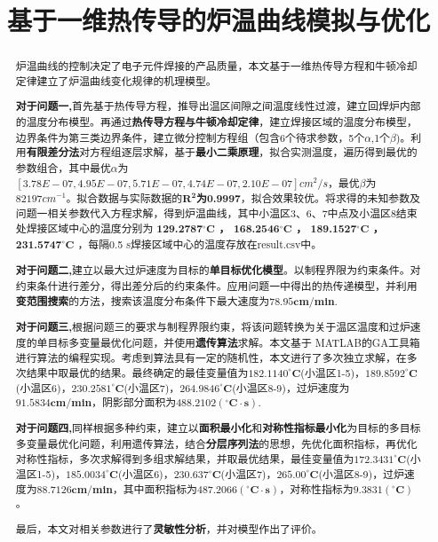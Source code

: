 \documentclass[withoutpreface,bwprint]{cumcmthesis} %
\title{基于一维热传导的炉温曲线模拟与优化}
\begin{document}
	\maketitle
	\begin{abstract}
		炉温曲线的控制决定了电子元件焊接的产品质量，本文基于一维热传导方程和牛顿冷却定律建立了炉温曲线变化规律的机理模型。
		
		\textbf{对于问题一,}首先基于热传导方程，推导出温区间隙之间温度线性过渡，建立回焊炉内部的温度分布模型。再通过\textbf{热传导方程与牛顿冷却定律}，建立焊接区域的温度分布模型，边界条件为第三类边界条件，建立微分控制方程组（包含6个待求参数，5个$\alpha$,1个$\beta$)。利用\textbf{有限差分法}对方程组逐层求解，基于\textbf{最小二乘原理}，拟合实测温度，遍历得到最优的参数组合，其中最优$\alpha$为$[3.78E-07, 4.95E-07 , 5.71E-07, 4.74E-07,  2.10E-07 ]cm^2/s$，最优$\beta$为$82197 cm^{-1}$。拟合数据与实际数据的\textbf{$\bm{R^2}$为0.9997}，拟合效果较优。将求得的未知参数及问题一相关参数代入方程求解，得到炉温曲线，其中小温区3、6、7中点及小温区8结束处焊接区域中心的温度分别为\textbf{	129.2787$\bm{^\circ C }$ ， 168.2546$\bm{^\circ C}$  ， 189.1527$\bm{^\circ C}$   ， 231.5747$\bm{^\circ C}$ }，每隔0.5 s焊接区域中心的温度存放在result.csv中。
		
		\textbf{对于问题二,}建立以最大过炉速度为目标的\textbf{单目标优化模型}。以制程界限为约束条件。对约束条什进行差分，得出差分后的约束条件。应用问题一中得出的热传递模型，并利用\textbf{变范围搜索}的方法，搜索该温度分布条件下最大速度为$\bm{78.95cm/min}$.
		
		\textbf{对于问题三,}根据问题三的要求与制程界限约東，将该问题转换为关于温区温度和过炉速度的单目标多变量最优化问题，并使用\textbf{遗传算法}求解。本文基于 MATLAB的GA工具箱进行算法的编程实现。考虑到算法具有一定的随机性，本文进行了多次独立求解，在多次结果中取最优的结果。最终确定的最佳变量值为$\bm{182.1140^\circ C} $(小温区1-5)，$\bm{189.8592^\circ C }$(小温区6)，$\bm{230.2581^\circ C }$(小温区7)，$\bm{264.9846^\circ C} $(小温区8-9)，过炉速度为$\bm{91.5834cm/min}$，阴影部分面积为$\bm{488.2102(^\circ C \cdot s)}$.
		
		\textbf{对于问题四,}同样根据多种约束，建立以\textbf{面积最小化}和\textbf{对称性指标最小化}为目标的多目标多变量最优化问题，利用遗传算法，结合\textbf{分层序列法}的思想，先优化面积指标，再优化对称性指标，多次求解得到多组求解结果，并取最优结果，最佳变量值为$\bm{172.3431^\circ C }$(小温区1-5)，$\bm{185.0034^\circ C} $(小温区6)，$\bm{230.637^\circ C }$(小温区7)，$\bm{265.00^\circ C }$(小温区8-9)，过炉速度为$\bm{88.7126cm/min}$，其中面积指标为$\bm{487.2066(^\circ C \cdot s)}$，对称性指标为$\bm{9.3831(^\circ C )}$。
		
		最后，本文对相关参数进行了\textbf{灵敏性分析}，并对模型作出了评价。
		
		
		
	\end{abstract}
	
\end{document}
